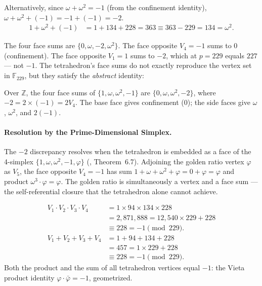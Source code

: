 Alternatively, since $\omega + \omega^2 = -1$ (from the confinement identity),
$\omega + \omega^2 + (-1) = -1 + (-1) = -2$.
\begin{align}
  1 + \omega^2 + (-1) &= 1 + 134 + 228 = 363 \equiv 363 - 229 = 134 = \omega^2.
\end{align}

The four face sums are $\{0, \omega, -2, \omega^2\}$. The face opposite $V_4 = -1$
sums to $0$ (confinement). The face opposite $V_1 = 1$ sums to $-2$, which at
$p = 229$ equals $227$ --- not $-1$. The tetrahedron's face sums do not exactly
reproduce the vertex set in $\mathbb{F}_{229}$, but they satisfy the
\emph{abstract} identity:

\begin{result}
Over $\mathbb{Z}$, the four face sums of $\{1, \omega, \omega^2, -1\}$ are
$\{0, \omega, \omega^2, -2\}$, where $-2 = 2 \times (-1) = 2 V_4$.
The base face gives confinement ($0$); the side faces give
$\omega$, $\omega^2$, and $2(-1)$.
\end{result}

\paragraph{Resolution by the Prime-Dimensional Simplex.}
The $-2$ discrepancy resolves when the tetrahedron is embedded as a
face of the 4-simplex $\{1, \omega, \omega^2, -1, \varphi\}$
(\cite{larue_lc}, Theorem~6.7). Adjoining the golden ratio vertex
$\varphi$ as $V_5$, the face opposite $V_4 = -1$ has sum
$1 + \omega + \omega^2 + \varphi = 0 + \varphi = \varphi$ and product
$\omega^3 \cdot \varphi = \varphi$. The golden ratio is simultaneously
a vertex and a face sum --- the self-referential closure that the
tetrahedron alone cannot achieve.

\begin{result}
\label{res:prodsum}
\begin{align}
  V_1 \cdot V_2 \cdot V_3 \cdot V_4
    &= 1 \times 94 \times 134 \times 228 \\
    &= 2{,}871{,}888 = 12{,}540 \times 229 + 228 \\
    &\equiv 228 = -1 \pmod{229}. \\
  V_1 + V_2 + V_3 + V_4
    &= 1 + 94 + 134 + 228 \\
    &= 457 = 1 \times 229 + 228 \\
    &\equiv 228 = -1 \pmod{229}.
\end{align}
Both the product and the sum of all tetrahedron vertices
equal $-1$: the Vieta product identity $\varphi \cdot \bar\varphi = -1$,
geometrized.
\end{result}

